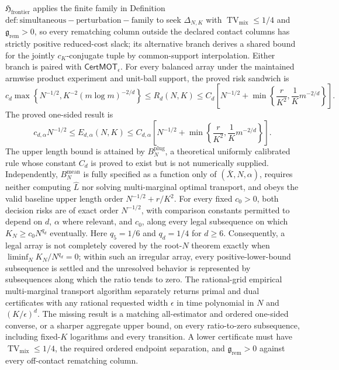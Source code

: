 \(\mathfrak H_{\mathrm{frontier}}\) applies the finite family in Definition \(\mathrm{def:simultaneous-perturbation-family}\) to seek \(\Delta_{N,K}\) with \(\operatorname{TV}_{\mathrm{mix}}\le1/4\) and \(\mathfrak g_{\mathrm{rem}}>0\), so every rematching column outside the declared contact columns has strictly positive reduced-cost slack; its alternative branch derives a shared bound for the jointly \(c_K\)-conjugate tuple by common-support interpolation. Either branch is paired with \(\mathsf{CertMOT}_\epsilon\).
For every balanced array under the maintained armwise product experiment and unit-ball support, the proved risk sandwich is
\[
c_d\max\left\{N^{-1/2},K^{-2}(m\log m)^{-2/d}\right\}
\le R_d(N,K)
\le C_d\left[N^{-1/2}+\min\left\{\frac r{K^2},\frac1K m^{-2/d}\right\}\right].
\]
The proved one-sided result is
\[
c_{d,\alpha}N^{-1/2}
\le E_{d,\alpha}(N,K)
\le C_{d,\alpha}\left[N^{-1/2}+\min\left\{\frac r{K^2},\frac1K m^{-2/d}\right\}\right].
\]
The upper length bound is attained by \(B_N^{\mathrm{plug}}\), a theoretical uniformly calibrated rule whose constant \(C_d\) is proved to exist but is not numerically supplied.  Independently, \(B_N^{\mathrm{mean}}\) is fully specified as a function only of \((\bar X,N,\alpha)\), requires neither computing \(\widehat L\) nor solving multi-marginal optimal transport, and obeys the valid baseline upper length order \(N^{-1/2}+r/K^2\).  For every fixed \(c_0>0\), both decision risks are of exact order \(N^{-1/2}\), with comparison constants permitted to depend on \(d\), \(\alpha\) where relevant, and \(c_0\), along every legal subsequence on which \(K_N\ge c_0N^{q_d}\) eventually.  Here \(q_5=1/6\) and \(q_d=1/4\) for \(d\ge6\).  Consequently, a legal array is not completely covered by the root-\(N\) theorem exactly when \(\liminf_N K_N/N^{q_d}=0\); within such an irregular array, every positive-lower-bound subsequence is settled and the unresolved behavior is represented by subsequences along which the ratio tends to zero.  The rational-grid empirical multi-marginal transport algorithm separately returns primal and dual certificates with any rational requested width \(\epsilon\) in time polynomial in \(N\) and \((K/\epsilon)^d\).  The missing result is a matching all-estimator and ordered one-sided converse, or a sharper aggregate upper bound, on every ratio-to-zero subsequence, including fixed-\(K\) logarithms and every transition.  A lower certificate must have \(\operatorname{TV}_{\mathrm{mix}}\le1/4\), the required ordered endpoint separation, and \(\mathfrak g_{\mathrm{rem}}>0\) against every off-contact rematching column.

